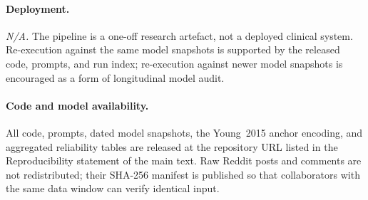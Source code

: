 \documentclass[11pt]{article}
\begin{document}
\paragraph{Deployment.}
\emph{N/A.} The pipeline is a one-off research artefact, not a
deployed clinical system. Re-execution against the same model
snapshots is supported by the released code, prompts, and run index;
re-execution against newer model snapshots is encouraged as a form of
longitudinal model audit.

\paragraph{Code and model availability.}
All code, prompts, dated model snapshots, the Young~2015 anchor
encoding, and aggregated reliability tables are released at the
repository URL listed in the Reproducibility statement of the main
text. Raw Reddit posts and comments are not redistributed; their
SHA-256 manifest is published so that collaborators with the same data
window can verify identical input.



\end{document}

